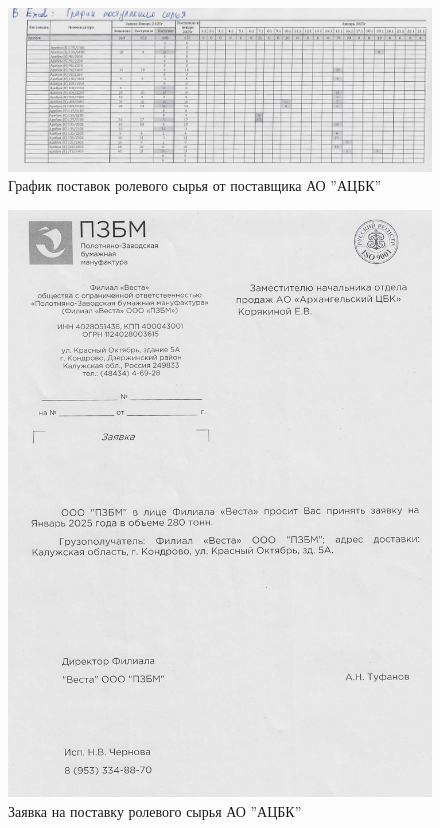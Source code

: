 \begin{figure}
\begin{center}
 \includegraphics[height=0.35\textheight, angle=90, keepaspectratio]{Pics/VII 6.jpg}
\end{center}
 \caption{График поставок ролевого сырья от поставщика АО ''АЦБК''}
 \label{pic:VII 6}
\end{figure}


\begin{figure}
\begin{center}
 \includegraphics[height=0.6\textheight, keepaspectratio]{Pics/VII 7.jpg}
\end{center}
 \caption{Заявка на поставку ролевого сырья АО ''АЦБК''}
 \label{pic:VII 7}
\end{figure}


